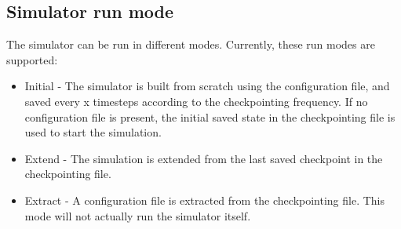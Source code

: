 \subsection{Simulator run mode}
	The simulator can be run in different modes. Currently, these run modes are supported: \\
	\begin{itemize}
		\item Initial - The simulator is built from scratch using the configuration file, and saved every x timesteps according to the checkpointing frequency. If no configuration file is present, the initial saved state in the checkpointing file is used to start the simulation.
		\item Extend - The simulation is extended from the last saved checkpoint in the checkpointing file.
		\item Extract - A configuration file is extracted from the checkpointing file. This mode will not actually run the simulator itself.
	\end{itemize}


\newpage


